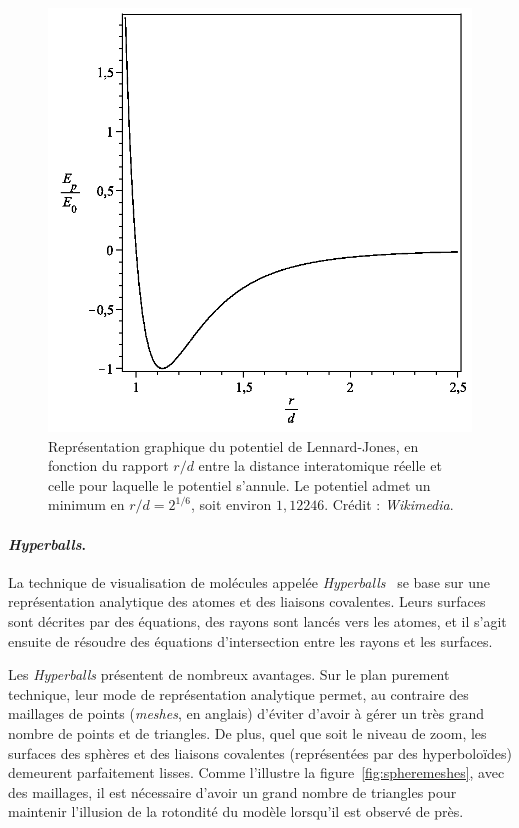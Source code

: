 	\begin{figure}[H]
		\centering
		\includegraphics[width=\textwidth]{figures/ch1/lennard-jones}
		\caption[Représentation graphique du potentiel de Lennard-Jones.]{Représentation graphique du potentiel de Lennard-Jones, en fonction du rapport $r/d$ entre la distance interatomique réelle et celle pour laquelle le potentiel s'annule. Le potentiel admet un minimum en $r/d = 2^{1/6}$, soit environ $1,12246$. Crédit : \emph{Wikimedia}.}
		\label{fig:lennard}
	\end{figure}
		
	\paragraph{\emph{Hyperballs}.} La technique de visualisation de molécules appelée \emph{Hyperballs}~\cite{chavent2011gpu} se base sur une représentation analytique des atomes et des liaisons covalentes. Leurs surfaces sont décrites par des équations, des rayons sont lancés vers les atomes, et il s'agit ensuite de résoudre des équations d'intersection entre les rayons et les surfaces.
		
	Les \emph{Hyperballs} présentent de nombreux avantages. Sur le plan purement technique, leur mode de représentation analytique permet, au contraire des maillages de points (\emph{meshes}, en anglais) d'éviter d'avoir à gérer un très grand nombre de points et de triangles. De plus, quel que soit le niveau de zoom, les surfaces des sphères et des liaisons covalentes (représentées par des hyperboloïdes) demeurent parfaitement lisses. Comme l'illustre la figure~\ref{fig:spheremeshes}, avec des maillages, il est nécessaire d'avoir un grand nombre de triangles pour maintenir l'illusion de la rotondité du modèle lorsqu'il est observé de près.
		

